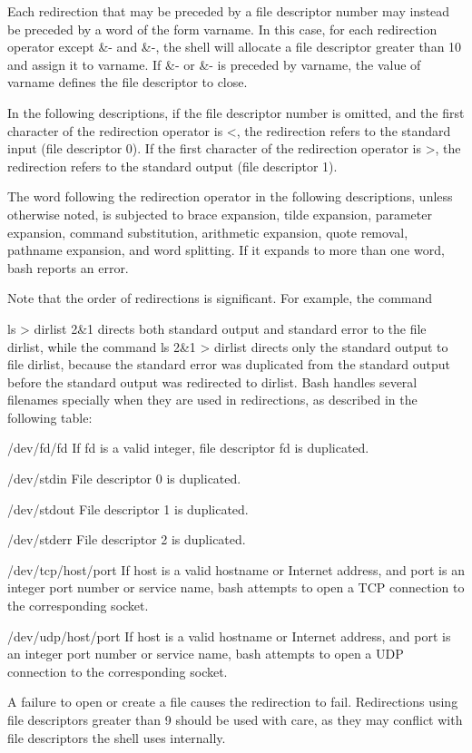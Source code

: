\documentclass[11pt]{article}
\begin{document}
{{{Each redirection that may be preceded by a file descriptor number may instead be preceded by a word of the form {varname}. In this case, for each redirection operator except \&- and \&-, the shell will allocate a file descriptor greater than 10 and assign it to varname. If \&- or \&- is preceded by {varname}, the value of varname defines the file descriptor to close.

In the following descriptions, if the file descriptor number is omitted, and the first character of the redirection operator is <, the redirection refers to the standard input (file descriptor 0). If the first character of the redirection operator is >, the redirection refers to the standard output (file descriptor 1).

The word following the redirection operator in the following descriptions, unless otherwise noted, is subjected to brace expansion, tilde expansion, parameter expansion, command substitution, arithmetic expansion, quote removal, pathname expansion, and word splitting. If it expands to more than one word, bash reports an error.

Note that the order of redirections is significant. For example, the command

ls > dirlist 2\&1
directs both standard output and standard error to the file dirlist, while the command
ls 2\&1 > dirlist
directs only the standard output to file dirlist, because the standard error was duplicated from the standard output before the standard output was redirected to dirlist.
Bash handles several filenames specially when they are used in redirections, as described in the following table:

/dev/fd/fd
If fd is a valid integer, file descriptor fd is duplicated.

/dev/stdin
File descriptor 0 is duplicated.

/dev/stdout
File descriptor 1 is duplicated.

/dev/stderr
File descriptor 2 is duplicated.

/dev/tcp/host/port
If host is a valid hostname or Internet address, and port is an integer port number or service name, bash attempts to open a TCP connection to the corresponding socket.

/dev/udp/host/port
If host is a valid hostname or Internet address, and port is an integer port number or service name, bash attempts to open a UDP connection to the corresponding socket.

A failure to open or create a file causes the redirection to fail.
Redirections using file descriptors greater than 9 should be used with care, as they may conflict with file descriptors the shell uses internally.

}}}
\end{document}
